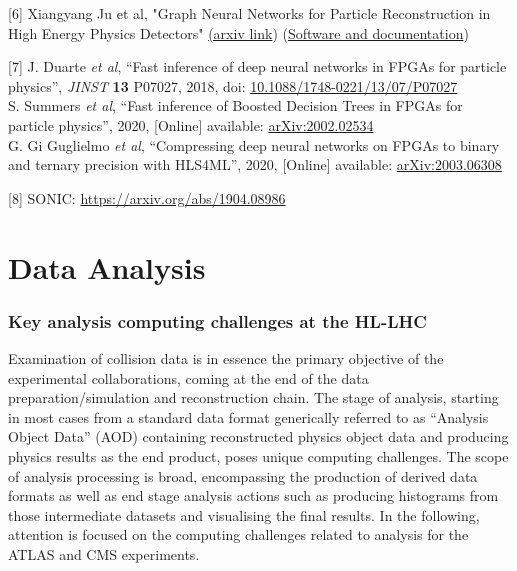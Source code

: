 \documentclass[11pt,a4paper]{article}
\begin{document}
{[}6{]} Xiangyang Ju et al, "Graph Neural Networks for Particle
Reconstruction in High Energy Physics Detectors"
\href{https://arxiv.org/abs/2003.11603}{{(arxiv link}})
(\href{https://github.com/exatrkx/exatrkx-neurips19}{{Software and
documentation}})

{[}7{]} J. Duarte \emph{et al}, ``Fast inference of deep neural networks
in FPGAs for particle physics'', \emph{JINST} \textbf{13} P07027, 2018,
doi:
\href{https://iopscience.iop.org/article/10.1088/1748-0221/13/07/P07027/meta}{{10.1088/1748-0221/13/07/P07027}}\\
S. Summers \emph{et al}, ``Fast inference of Boosted Decision Trees in
FPGAs for particle physics'', 2020, {[}Online{]} available:
\href{https://arxiv.org/abs/2002.02534}{{arXiv:2002.02534}}\\
G. Gi Guglielmo \emph{et al}, ``Compressing deep neural networks on
FPGAs to binary and ternary precision with HLS4ML'', 2020, {[}Online{]}
available: \href{https://arxiv.org/abs/2003.06308}{{arXiv:2003.06308}}

{[}8{]} SONIC:
\href{https://arxiv.org/abs/1904.08986}{{https://arxiv.org/abs/1904.08986}}

\hypertarget{data-analysis}{%
\section{Data Analysis}\label{data-analysis}}

\hypertarget{key-analysis-computing-challenges-at-the-hl-lhc}{%
\subsubsection{Key analysis computing challenges at the
HL-LHC}\label{key-analysis-computing-challenges-at-the-hl-lhc}}

Examination of collision data is in essence the primary objective of the
experimental collaborations, coming at the end of the data
preparation/simulation and reconstruction chain. The stage of analysis,
starting in most cases from a standard data format generically referred
to as ``Analysis Object Data'' (AOD) containing reconstructed physics
object data and producing physics results as the end product, poses
unique computing challenges. The scope of analysis processing is broad,
encompassing the production of derived data formats as well as end stage
analysis actions such as producing histograms from those intermediate
datasets and visualising the final results. In the following, attention
is focused on the computing challenges related to analysis for the ATLAS
and CMS experiments.
\end{document}
